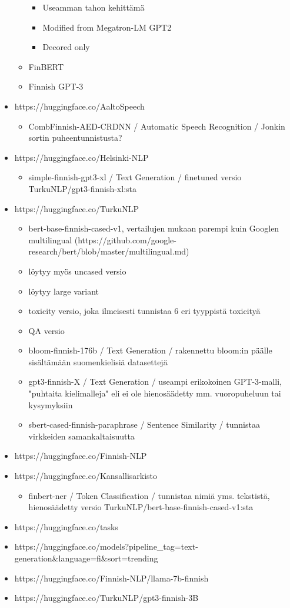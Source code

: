 \begin{itemize}
\begin{itemize}
\begin{itemize}
      \item Useamman tahon kehittämä
      \item Modified from Megatron-LM GPT2
      \item Decored only
    \end{itemize}
    \item FinBERT
    \item Finnish GPT-3
  \end{itemize}
  \item https://huggingface.co/AaltoSpeech
  \begin{itemize}
    \item CombFinnish-AED-CRDNN / Automatic Speech Recognition / Jonkin sortin puheentunnistusta?
  \end{itemize}
  \item https://huggingface.co/Helsinki-NLP
  \begin{itemize}
    \item simple-finnish-gpt3-xl / Text Generation / finetuned versio TurkuNLP/gpt3-finnish-xl:sta
  \end{itemize}
  \item https://huggingface.co/TurkuNLP
  \begin{itemize}
    \item bert-base-finnish-cased-v1, vertailujen mukaan parempi kuin Googlen multilingual (https://github.com/google-research/bert/blob/master/multilingual.md)
    \item löytyy myös uncased versio
    \item löytyy large variant
    \item toxicity versio, joka ilmeisesti tunnistaa 6 eri tyyppistä toxicityä
    \item QA versio
    \item bloom-finnish-176b / Text Generation / rakennettu bloom:in päälle sisältämään suomenkielisiä datasettejä
    \item gpt3-finnish-X / Text Generation / useampi erikokoinen GPT-3-malli, "puhtaita kielimalleja" eli ei ole hienosäädetty mm. vuoropuheluun tai kysymyksiin
    \item sbert-cased-finnish-paraphrase / Sentence Similarity / tunnistaa virkkeiden samankaltaisuutta
  \end{itemize}
  \item https://huggingface.co/Finnish-NLP
  \item https://huggingface.co/Kansallisarkisto
  \begin{itemize}
    \item finbert-ner / Token Classification / tunnistaa nimiä yms. tekstistä, hienosäädetty versio TurkuNLP/bert-base-finnish-cased-v1:sta
  \end{itemize}
  \item https://huggingface.co/tasks
  \item https://huggingface.co/models?pipeline\_tag=text-generation\&language=fi\&sort=trending
  \item https://huggingface.co/Finnish-NLP/llama-7b-finnish
  \item https://huggingface.co/TurkuNLP/gpt3-finnish-3B
\end{itemize}

